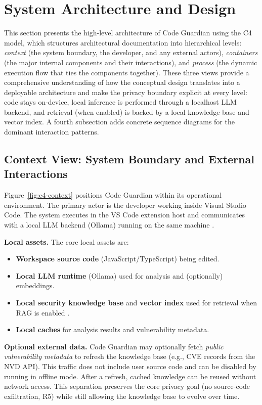\section{System Architecture and Design}
\label{sec:system-architecture}

This section presents the high-level architecture of Code Guardian using the C4 model, which structures architectural documentation into hierarchical levels: \emph{context} (the system boundary, the developer, and any external actors), \emph{containers} (the major internal components and their interactions), and \emph{process} (the dynamic execution flow that ties the components together). These three views provide a comprehensive understanding of how the conceptual design translates into a deployable architecture and make the privacy boundary explicit at every level: code stays on-device, local inference is performed through a localhost LLM backend, and retrieval (when enabled) is backed by a local knowledge base and vector index. A fourth subsection adds concrete sequence diagrams for the dominant interaction patterns.

\subsection{Context View: System Boundary and External Interactions}
\label{subsec:context-view}

Figure~\ref{fig:c4-context} positions Code Guardian within its operational environment. The primary actor is the developer working inside Visual Studio Code. The system executes in the VS Code extension host and communicates with a local LLM backend (Ollama) running on the same machine \cite{ollamaDocs}.

\textbf{Local assets.} The core local assets are:
\begin{itemize}
    \item \textbf{Workspace source code} (JavaScript/TypeScript) being edited.
    \item \textbf{Local LLM runtime} (Ollama) used for analysis and (optionally) embeddings.
    \item \textbf{Local security knowledge base} and \textbf{vector index} used for retrieval when RAG is enabled \cite{langchainDocs,malkov2018hnsw}.
    \item \textbf{Local caches} for analysis results and vulnerability metadata.
\end{itemize}

\textbf{Optional external data.} Code Guardian may optionally fetch \emph{public vulnerability metadata} to refresh the knowledge base (e.g., CVE records from the NVD API). This traffic does not include user source code and can be disabled by running in offline mode. After a refresh, cached knowledge can be reused without network access. This separation preserves the core privacy goal (no source-code exfiltration, R5) while still allowing the knowledge base to evolve over time.

